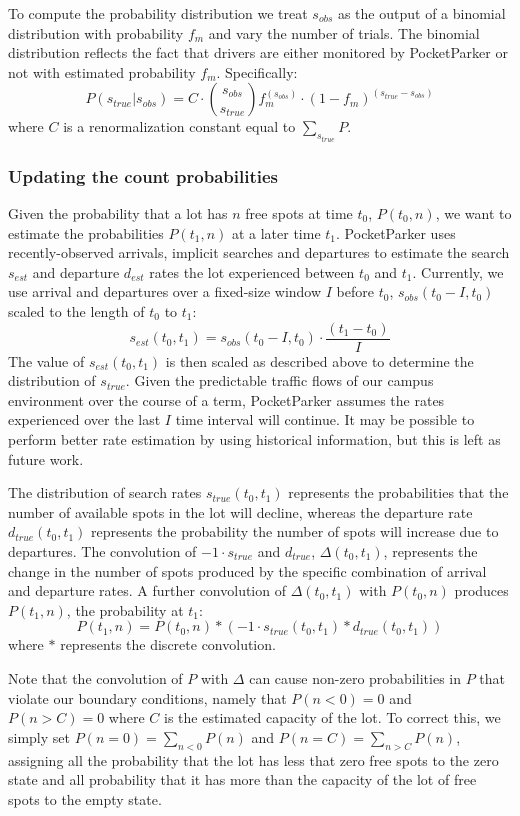 \documentclass{sigchi}
\begin{document}
To compute the probability distribution we treat $s_{obs}$ as the output of a
binomial distribution with probability $f_m$ and vary the number of trials.
The binomial distribution reflects the fact that drivers are either monitored
by PocketParker or not with estimated probability $f_m$. Specifically:
%
\[
%
P(s_{true}| s_{obs}) = C \cdot {s_{obs} \choose s_{true}}
f_m^{(s_{obs})} \cdot (1 - f_m)^{(s_{true} - s_{obs})}
%
\]
%
where $C$ is a renormalization constant equal to $\sum_{s_{true}} P$.

\subsubsection{Updating the count probabilities}

Given the probability that a lot has $n$ free spots at time $t_0$, $P(t_0,
n)$, we want to estimate the probabilities $P(t_1, n)$ at a later time $t_1$.
PocketParker uses recently-observed arrivals, implicit searches and
departures to estimate the search $s_{est}$ and departure $d_{est}$ rates the
lot experienced between $t_0$ and $t_1$. Currently, we use arrival and
departures over a fixed-size window $I$ before $t_0$, $s_{obs}(t_0 -
I, t_0)$ scaled to the length of $t_0$ to $t_1$:
%
\[s_{est}(t_0, t_1) = s_{obs}(t_0 - I, t_0) \cdot \frac{(t_1 - t_0)}{I} \]
%
The value of $s_{est}(t_0, t_1)$ is then scaled as described above to
determine the distribution of $s_{true}$.  Given the predictable traffic flows
of our campus environment over the course of a term, PocketParker assumes the
rates experienced over the last $I$ time interval will continue. It may be
possible to perform better rate estimation by using historical information,
but this is left as future work.

The distribution of search rates $s_{true}(t_0, t_1)$ represents the
probabilities that the number of available spots in the lot will decline,
whereas the departure rate $d_{true}(t_0, t_1)$ represents the probability
the number of spots will increase due to departures. The convolution of $-1
\cdot s_{true}$ and $d_{true}$, $\Delta(t_0, t_1)$, represents the change in
the number of spots produced by the specific combination of arrival and
departure rates. A further convolution of $\Delta(t_0, t_1)$ with $P(t_0,
n)$ produces $P(t_1, n)$, the probability at $t_1$:
%
\[ P(t_1, n) = P(t_0, n) * (-1 \cdot s_{true}(t_0, t_1) * d_{true}(t_0,
t_1)) \]
%
where $*$ represents the discrete convolution.

Note that the convolution of $P$ with $\Delta$ can cause non-zero
probabilities in $P$ that violate our boundary conditions, namely that
$P(n < 0) = 0$ and $P(n > C) = 0$ where $C$ is the estimated capacity of
the lot. To correct this, we simply set $P(n = 0) = \sum_{n < 0} P(n)$
and $P(n = C) = \sum_{n > C} P(n)$, assigning all the probability that
the lot has less that zero free spots to the zero state and all probability
that it has more than the capacity of the lot of free spots to the empty
state.
\end{document}
